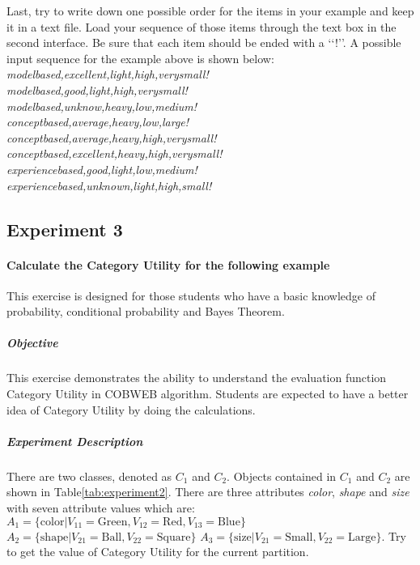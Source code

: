 Last, try to write down one possible order for the items in your example and keep it in a text file. Load your sequence of those items through the text box in the second interface. Be sure that each item should be ended with a \lq\lq{!}\rq\rq. A possible input sequence for the example above is shown below:\\
\emph{modelbased,excellent,light,high,verysmall!\\
modelbased,good,light,high,verysmall!\\
modelbased,unknow,heavy,low,medium!\\
conceptbased,average,heavy,low,large!\\
conceptbased,average,heavy,high,verysmall!\\
conceptbased,excellent,heavy,high,verysmall!\\
experiencebased,good,light,low,medium!\\
experiencebased,unknown,light,high,small!\\}
 
 \subsection{Experiment 3}
 \paragraph{Calculate the Category Utility for the following example} This exercise is designed for those students who have a basic knowledge of probability, conditional probability and Bayes Theorem. 
 \subparagraph{Objective} This exercise demonstrates the ability to understand the evaluation function Category Utility in COBWEB algorithm. Students are expected to have a better idea of Category Utility by doing the calculations. 
 \subparagraph{Experiment Description} There are two classes, denoted as $C_1$ and $C_2$. Objects contained in $C_1$ and $C_2$ are shown in Table\ref{tab:experiment2}. There are three attributes \emph{color}, \emph{shape} and \emph{size} with seven attribute values which are: $A_1=\{\text{color}|V_{11}=\text{Green},V_{12}=\text{Red}, V_{13}=\text{Blue}\}$
 $A_2=\{\text{shape}|V_{21}=\text{Ball}, V_{22}=\text{Square}\}$
 $A_3=\{\text{size}|V_{21}=\text{Small}, V_{22}=\text{Large}\}$. Try to get the value of Category Utility for the current partition.
 
